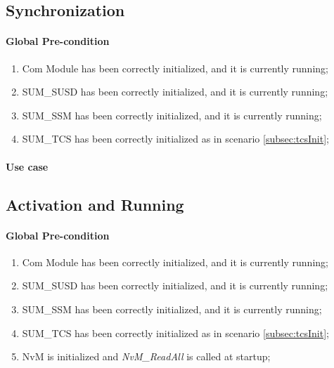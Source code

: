 \subsection{Synchronization}

\paragraph{Global Pre-condition}
\begin{enumerate}
	\item Com Module has been correctly initialized, and it is currently running;
	\item SUM\_SUSD has been correctly initialized, and it is currently running;
	\item SUM\_SSM has been correctly initialized, and it is currently running;
	\item SUM\_TCS has been correctly initialized as in scenario \ref{subsec:tcsInit};
\end{enumerate}

\paragraph{Use case}


{  }

\subsection{Activation and Running}
\paragraph{Global Pre-condition}
\begin{enumerate}
	\item Com Module has been correctly initialized, and it is currently running;
	\item SUM\_SUSD has been correctly initialized, and it is currently running;
	\item SUM\_SSM has been correctly initialized, and it is currently running;
	\item SUM\_TCS has been correctly initialized as in scenario \ref{subsec:tcsInit};
	\item NvM is initialized and \textit{NvM_ReadAll} is called at startup;
\end{enumerate}


